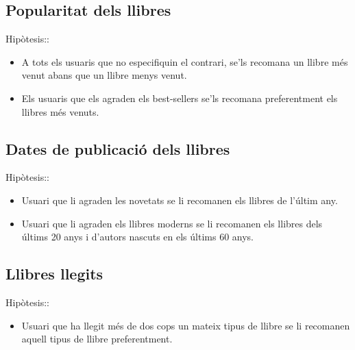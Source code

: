 \subsection{Popularitat dels llibres}
Hipòtesis::
\begin{itemize}
  \item A tots els usuaris que no especifiquin el contrari, se'ls recomana un llibre més venut abans que un llibre menys venut.
  \item Els usuaris que els agraden els best-sellers se'ls recomana preferentment els llibres més venuts.
\end{itemize}

\subsection{Dates de publicació dels llibres}
Hipòtesis::
\begin{itemize}
  \item Usuari que li agraden les novetats se li recomanen els llibres de l'últim any.
  \item Usuari que li agraden els llibres moderns se li recomanen els llibres dels  últims 20 anys i d'autors nascuts en els últims 60 anys.
\end{itemize}

\subsection{Llibres llegits}
Hipòtesis::
\begin{itemize}
  \item Usuari que ha llegit més de dos cops un mateix tipus de llibre se li recomanen aquell tipus de llibre preferentment.
\end{itemize}




